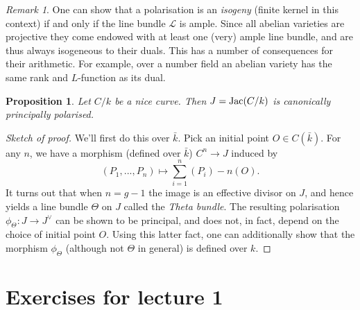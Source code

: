 \documentclass[12pt]{amsart}
\numberwithin{equation}{section}
\newtheorem{proposition}[equation]{Proposition}
\theoremstyle{remark}
\newtheorem{remark}[equation]{Remark}
\theoremstyle{definition}
\theoremstyle{definition}
\theoremstyle{definition}
\theoremstyle{definition}
\theoremstyle{definition}
\theoremstyle{definition}
\begin{document}
\begin{remark}
One can show that a polarisation is an \textit{isogeny} (finite kernel in this context) if and only if the line bundle $\mathcal{L}$ is ample.  
Since all abelian varieties are projective they come endowed with at least one (very) ample line bundle, and are thus always isogeneous to their duals. This has a number of consequences for their arithmetic. For example, over a number field an abelian variety has the same rank and $L$-function as its dual.
\end{remark}

\begin{proposition}
Let $C/k$ be a nice curve. Then $J=\textup{Jac}(C/k)$ is canonically principally polarised. 
\end{proposition}

\begin{proof}[Sketch of proof]
We'll first do this over $\bar{k}$. Pick an initial point $O\in C(\bar{k})$. For any $n$, we have a morphism (defined over $\bar{k}$) $C^n\rightarrow J$ induced by
\[(P_1,...,P_n)\mapsto \sum_{i=1}^n (P_i) - n(O).\]
It turns out that when $n=g-1$ the image is an effective divisor on $J$, and hence yields a line bundle $\Theta$ on $J$ called the \textit{Theta bundle}. The resulting polarisation $\phi_\Theta:J\rightarrow J^\vee$ can be shown to be principal, and does not, in fact, depend on the choice of initial point $O$. Using this latter fact, one can additionally show that the morphism $\phi_{\Theta}$ (although not $\Theta$ in general) is defined over $k$.
\end{proof}

\newpage

\section{Exercises for lecture 1}
\end{document}
